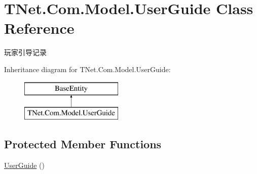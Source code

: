 \hypertarget{class_t_net_1_1_com_1_1_model_1_1_user_guide}{}\section{T\+Net.\+Com.\+Model.\+User\+Guide Class Reference}
\label{class_t_net_1_1_com_1_1_model_1_1_user_guide}


玩家引导记录  


Inheritance diagram for T\+Net.\+Com.\+Model.\+User\+Guide\+:\begin{figure}[H]
\begin{center}
\leavevmode
\includegraphics[height=2.000000cm]{class_t_net_1_1_com_1_1_model_1_1_user_guide}
\end{center}
\end{figure}
\subsection*{Protected Member Functions}
\begin{DoxyCompactItemize}
\item 
\mbox{\hyperlink{class_t_net_1_1_com_1_1_model_1_1_user_guide_a6fd5dbfec60395036ba07e43def35777}{User\+Guide}} ()
\end{DoxyCompactItemize}
